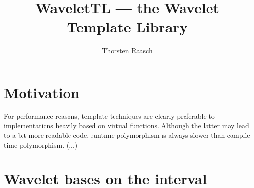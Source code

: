 \documentclass{article}
\begin{document}
\title{WaveletTL --- the Wavelet Template Library}
\author{Thorsten Raasch}

\maketitle

\section{Motivation}
For performance reasons, template techniques are clearly preferable to implementations heavily based on virtual functions. Although the latter may lead to a bit more readable code, runtime polymorphism is always slower than compile time polymorphism.
(...)

\section{Wavelet bases on the interval}
\label{sec:interval}
\end{document}
